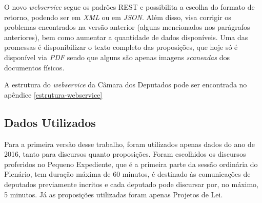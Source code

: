 O novo \textit{webservice} segue os padrões REST e possibilita a escolha do formato de retorno, podendo ser em \textit{XML} ou em  \textit{JSON}. Além disso, visa corrigir os problemas encontrados na versão anterior (alguns mencionados nos parágrafos anteriores), bem como aumentar a quantidade de dados disponíveis. Uma das promessas é disponibilizar o texto completo das proposições, que hoje só é disponível via \textit{PDF} sendo que alguns são apenas imagens \textit{scaneadas} dos documentos físicos.

A estrutura do \textit{webservice} da Câmara dos Deputados pode ser encontrada no apêndice \ref{estrutura-webservice}

\subsection{Dados Utilizados}

Para a primeira versão desse trabalho, foram utilizados apenas dados do ano de 2016, tanto para discursos quanto proposições. Foram escolhidos os discursos proferidos no Pequeno Expediente, que é a primeira parte da sessão ordinária do Plenário, tem duração máxima de 60 minutos, é destinado às comunicações de deputados previamente incritos e cada deputado pode discursar por, no máximo, 5 minutos. Já as proposições utilizadas foram apenas Projetos de Lei.
